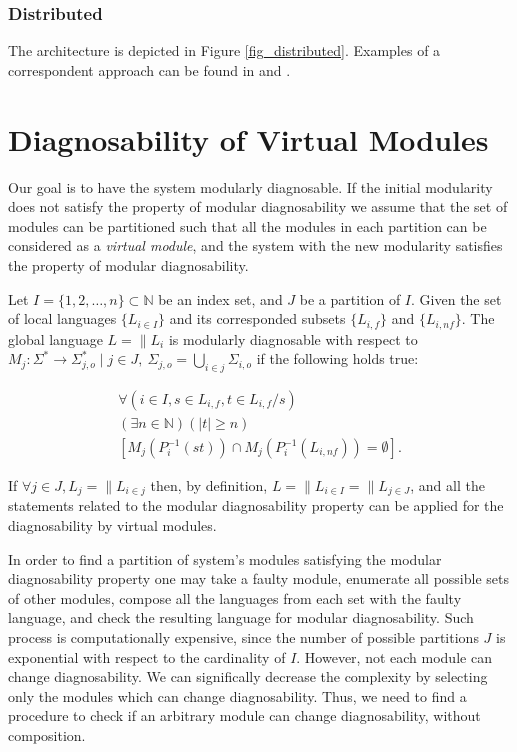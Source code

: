 \documentclass[a4paper, 10pt, conference]{ieeeconf}
\begin{document}
\subsubsection{Distributed}
The architecture is depicted in Figure \ref{fig_distributed}.
Examples of a correspondent approach can be found in
\cite{pencole_formal_2005} and \cite{schumann_decentralised_2010}.


\section{Diagnosability of Virtual Modules}
\label{sec:Proposal}

Our goal is to have the system modularly diagnosable. If the initial modularity
does not satisfy the property of modular diagnosability we assume that the set
of modules can be partitioned such that all the modules in each partition can be
considered as a \emph{virtual module}, and the system with the new modularity
satisfies the property of modular diagnosability.

\begin{definition} 
Let $I = \{1,2,\ldots,n\} \subset  \mathbb{N}$ be an index set, and $J$ be a
partition of $I$. Given the set of local languages $\{L_{i \in I}\}$ and its
corresponded subsets $\{L_{i,f}\}$ and $\{L_{i,nf}\}$. The global language $L =
\parallel L_i$ is modularly diagnosable with respect to
$M_j: \Sigma^* \rightarrow \Sigma_{j,o}^* 
\mid j \in J, ~\Sigma_{j,o} =\bigcup_{i \in j} \Sigma_{i,o}$ 
if the following holds true:
\end{definition}
\begin{equation}
\begin{array}{l}
	\forall(i \in I, s \in L_{i,f}, t \in L_{i,f}/s)
	\\
	(\exists n \in \mathbb{N})
	(|t| \geq n)
	\\
	\left[ M_j(P_i^{-1}(st)) \cap M_j(P_i^{-1}(L_{i,nf})) = \emptyset \right].
\end{array}
\end{equation}

If $\forall j \in J, L_{j} = \parallel L_{i \in j}$ then, by definition, $L =
\parallel L_{i \in I} = \parallel L_{j \in J}$, and all the statements related
to the modular diagnosability  property can be applied for the diagnosability by
virtual modules.

In order to find a partition of system's modules satisfying the modular
diagnosability property one may take a faulty module, enumerate all possible
sets of other modules, compose all the languages from each set with the faulty
language, and check the resulting language for modular diagnosability.
Such process is computationally expensive, since the number of possible
partitions $J$ is exponential with respect to the cardinality of $I$. However,
not each module can change diagnosability. We can significally decrease the
complexity by selecting only the modules which can change diagnosability. Thus,
we need to find a procedure to check if an arbitrary module can change
diagnosability, without composition.
\end{document}
